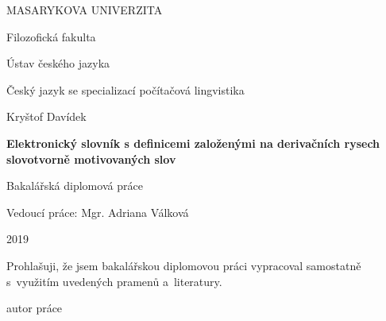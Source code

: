 \documentclass[a4paper,12pt,openany,twoside]{book} %
\begin{document}
	\clearpage

	\begin{titlepage}
		\begin{center}
			{\Large\uppercase{Masarykova univerzita}}

			\vspace{1em}

			{\Large Filozofická fakulta}

			\vspace{1em}

			{\large Ústav českého jazyka}

			\vspace{1em}

			{\large Český jazyk se specializací počítačová lingvistika}

			\vspace{11em}

			{\large Kryštof Davídek }
			
			\vspace{3em}
			
			{\LARGE\bf Elektronický slovník s definicemi založenými na derivačních rysech slovotvorně motivovaných slov}

			\vspace{1.5em}

			{\Large Bakalářská diplomová práce}

			\vfill
			\vspace{3em}
			Vedoucí práce: Mgr. Adriana Válková
			
			2019
		\end{center}
	\end{titlepage}


\cleardoublepage

\par
\par\vspace*{\fill}
	\pagestyle{plain}
\begin{flushright}
	Prohlašuji, že jsem bakalářskou diplomovou práci vypracoval samostatně s~využitím uvedených pramenů a~literatury.

	\vspace{3em}

	    \makebox[2.5in][r]{\dotfill}
	    
	    autor práce

	    \par

\end{flushright}
\clearpage
\end{document}
